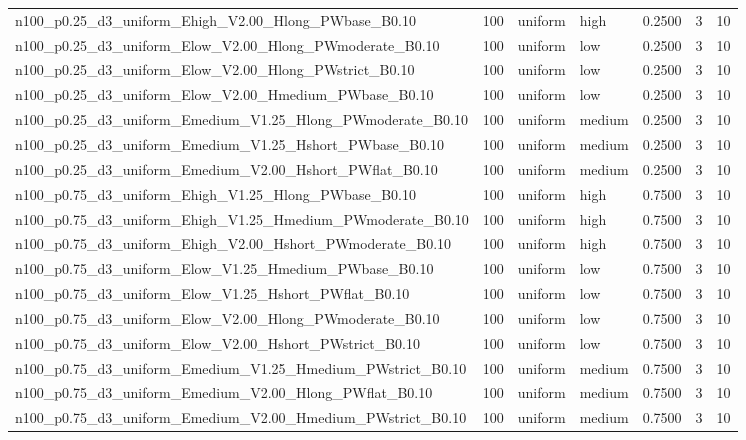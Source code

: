 \begin{tabular}{lrllrrr}
n100_p0.25_d3_uniform_Ehigh_V2.00_Hlong_PWbase_B0.10 & 100 & uniform & high & 0.2500 & 3 & 10 \\
n100_p0.25_d3_uniform_Elow_V2.00_Hlong_PWmoderate_B0.10 & 100 & uniform & low & 0.2500 & 3 & 10 \\
n100_p0.25_d3_uniform_Elow_V2.00_Hlong_PWstrict_B0.10 & 100 & uniform & low & 0.2500 & 3 & 10 \\
n100_p0.25_d3_uniform_Elow_V2.00_Hmedium_PWbase_B0.10 & 100 & uniform & low & 0.2500 & 3 & 10 \\
n100_p0.25_d3_uniform_Emedium_V1.25_Hlong_PWmoderate_B0.10 & 100 & uniform & medium & 0.2500 & 3 & 10 \\
n100_p0.25_d3_uniform_Emedium_V1.25_Hshort_PWbase_B0.10 & 100 & uniform & medium & 0.2500 & 3 & 10 \\
n100_p0.25_d3_uniform_Emedium_V2.00_Hshort_PWflat_B0.10 & 100 & uniform & medium & 0.2500 & 3 & 10 \\
n100_p0.75_d3_uniform_Ehigh_V1.25_Hlong_PWbase_B0.10 & 100 & uniform & high & 0.7500 & 3 & 10 \\
n100_p0.75_d3_uniform_Ehigh_V1.25_Hmedium_PWmoderate_B0.10 & 100 & uniform & high & 0.7500 & 3 & 10 \\
n100_p0.75_d3_uniform_Ehigh_V2.00_Hshort_PWmoderate_B0.10 & 100 & uniform & high & 0.7500 & 3 & 10 \\
n100_p0.75_d3_uniform_Elow_V1.25_Hmedium_PWbase_B0.10 & 100 & uniform & low & 0.7500 & 3 & 10 \\
n100_p0.75_d3_uniform_Elow_V1.25_Hshort_PWflat_B0.10 & 100 & uniform & low & 0.7500 & 3 & 10 \\
n100_p0.75_d3_uniform_Elow_V2.00_Hlong_PWmoderate_B0.10 & 100 & uniform & low & 0.7500 & 3 & 10 \\
n100_p0.75_d3_uniform_Elow_V2.00_Hshort_PWstrict_B0.10 & 100 & uniform & low & 0.7500 & 3 & 10 \\
n100_p0.75_d3_uniform_Emedium_V1.25_Hmedium_PWstrict_B0.10 & 100 & uniform & medium & 0.7500 & 3 & 10 \\
n100_p0.75_d3_uniform_Emedium_V2.00_Hlong_PWflat_B0.10 & 100 & uniform & medium & 0.7500 & 3 & 10 \\
n100_p0.75_d3_uniform_Emedium_V2.00_Hmedium_PWstrict_B0.10 & 100 & uniform & medium & 0.7500 & 3 & 10 \\
\bottomrule
\end{tabular}
